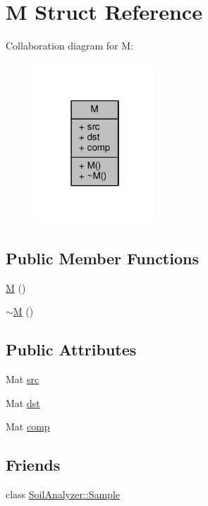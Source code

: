 \hypertarget{struct_m}{}\section{M Struct Reference}
\label{struct_m}


Collaboration diagram for M\+:\nopagebreak
\begin{figure}[H]
\begin{center}
\leavevmode
\includegraphics[width=130pt]{struct_m__coll__graph}
\end{center}
\end{figure}
\subsection*{Public Member Functions}
\begin{DoxyCompactItemize}
\item 
\hyperlink{struct_m_a5466fd39fe84f5612cb451d4b019b2b5}{M} ()
\item 
\hyperlink{struct_m_a295b1a6d3b58720b956161bf811a31c1}{$\sim$\+M} ()
\end{DoxyCompactItemize}
\subsection*{Public Attributes}
\begin{DoxyCompactItemize}
\item 
Mat \hyperlink{struct_m_ae37eecb837e8d52a27330268e4b12a34}{src}
\item 
Mat \hyperlink{struct_m_a08a6e094da4841420fd9489705ecb7a3}{dst}
\item 
Mat \hyperlink{struct_m_aea135e95a654e5a8fff759cd5c104405}{comp}
\end{DoxyCompactItemize}
\subsection*{Friends}
\begin{DoxyCompactItemize}
\item 
class \hyperlink{struct_m_a83d1981518b48903f64d0e6333f5a0c0}{Soil\+Analyzer\+::\+Sample}
\end{DoxyCompactItemize}


